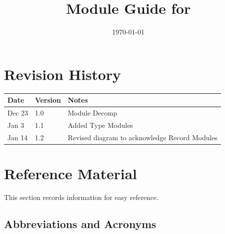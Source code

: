 \documentclass[12pt, titlepage]{article}
\begin{document}
\title{Module Guide for \progname{}} 
\author{\authname}
\date{\today}

\maketitle


\section{Revision History}

\begin{tabularx}{\textwidth}{p{3cm}p{2cm}X}
\toprule {\bf Date} & {\bf Version} & {\bf Notes}\\
\midrule
Dec 23 & 1.0 & Module Decomp\\
Jan 3 & 1.1 & Added Type Modules\\
Jan 14 & 1.2 & Revised diagram to acknowledge Record Modules\\

\bottomrule
\end{tabularx}

\newpage

\section{Reference Material}

This section records information for easy reference.

\subsection{Abbreviations and Acronyms}
\end{document}

